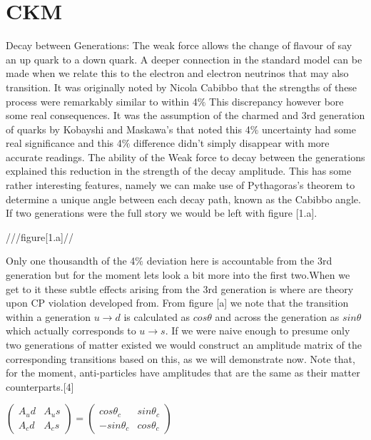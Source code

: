  
%
\section*{CKM}

Decay between Generations:
The weak force allows the change of flavour of say an up quark to a down quark. A deeper connection in the standard model can be made when we relate this to the electron and electron neutrinos that may also transition. It was originally noted by Nicola Cabibbo that the strengths of these process were remarkably similar to within 4$\%$ This discrepancy however bore some real consequences. It was the assumption of the charmed and 3rd generation of quarks by Kobayshi and Maskawa’s that noted this 4$\%$ uncertainty had some real significance and this 4$\%$ difference didn't simply disappear with more accurate readings. The ability of the Weak force to decay between the generations explained this reduction in the strength of the decay amplitude. This has some rather interesting features, namely we can make use of Pythagoras’s theorem to determine a unique angle between each decay path, known as the Cabibbo angle. If two generations were the full story we would be left with figure [1.a].

///figure[1.a]//

Only one thousandth of the 4$\%$ deviation here is accountable from the 3rd generation but for the moment lets look a bit more into the first two.When we get to it these subtle effects arising from the 3rd generation is where are theory upon CP violation developed from. From figure [a] we note that the transition within a generation $u\rightarrow d$ is calculated as $cos\theta$ and across the generation as $sin\theta$ which actually corresponds to $u\rightarrow s$. If we were naive enough to presume only two generations of matter existed we would construct an amplitude matrix of the corresponding transitions based on this, as we will demonstrate now. Note that, for the moment, anti-particles have amplitudes that are the same as their matter counterparts.[4]

$\begin{pmatrix} A_ud & A_us \\ A_cd & A_cs \end{pmatrix} = \begin{pmatrix} cos\theta_c & sin\theta_c \\ -sin\theta_c & cos\theta_c \end{pmatrix}$

